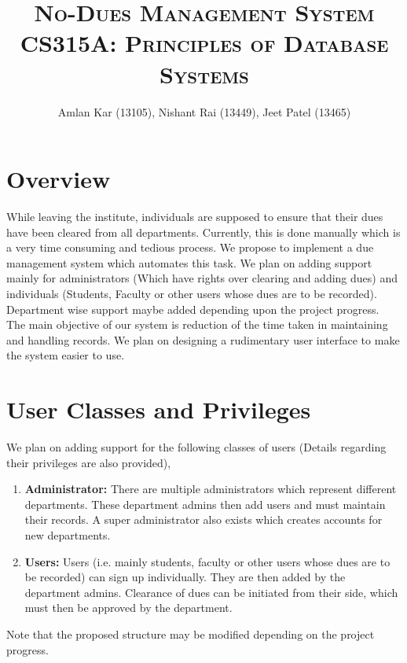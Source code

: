 \documentclass[12pt]{article}
\title{\Huge\textsc{No-Dues Management System}\\ \vspace{6mm}
\Large\textsc{CS315A: Principles of Database Systems}}
\author{\small{Amlan Kar (13105), Nishant Rai (13449), Jeet Patel (13465)}}
\date{\vspace{-5ex}}
\begin{document}
	\maketitle
		
	\section{Overview}
	
While leaving the institute, individuals are supposed to ensure that their dues have been cleared from all departments. Currently, this is done manually which is a very time consuming and tedious process. We propose to implement a due management system which automates this task. We plan on adding support mainly for administrators (Which have rights over clearing and adding dues) and individuals (Students, Faculty or other users whose dues are to be recorded). Department wise support maybe added depending upon the project progress.\\

\noindent
The main objective of our system is reduction of the time taken in maintaining and handling records. We plan on designing a rudimentary user interface to make the system easier to use.

	\section{User Classes and Privileges}	
	
	We plan on adding support for the following classes of users (Details regarding their privileges are also provided),	
	
	\begin{enumerate}
		\item \textbf{Administrator:} There are multiple administrators which represent different departments. These department admins then add users and must maintain their records. A super administrator also exists which creates accounts for new departments.
		\item \textbf{Users:} Users (i.e. mainly students, faculty or other users whose dues are to be recorded) can sign up individually. They are then added by the department admins. Clearance of dues can be initiated from their side, which must then be approved by the department.
	\end{enumerate}

\noindent
Note that the proposed structure may be modified depending on the project progress.

	

	
\end{document}
